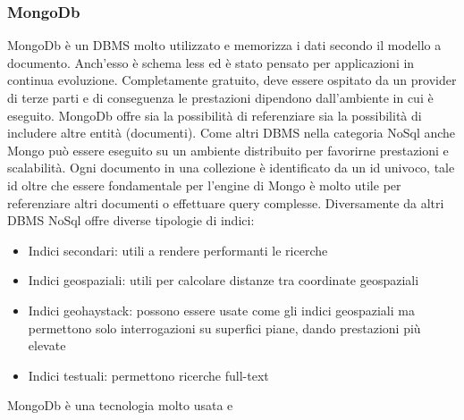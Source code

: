 \subsubsection*{MongoDb}
MongoDb è un DBMS molto utilizzato e memorizza i dati secondo il modello a documento. Anch'esso è schema less ed è stato pensato per applicazioni in continua evoluzione. Completamente gratuito, deve essere ospitato da un provider di terze parti e di conseguenza le prestazioni dipendono dall'ambiente in cui è eseguito. 
MongoDb offre sia la possibilità di referenziare sia la possibilità di includere altre entità (documenti). 
Come altri DBMS nella categoria NoSql anche Mongo può essere eseguito su un ambiente distribuito per favorirne prestazioni e scalabilità. Ogni documento in una collezione è identificato da un id univoco, tale id oltre che essere fondamentale per l'engine di Mongo è molto utile per referenziare altri documenti o effettuare query complesse.
Diversamente da altri DBMS NoSql offre diverse tipologie di indici:
\begin{itemize}
	\item Indici secondari: utili a rendere performanti le ricerche
	\item Indici geospaziali: utili per calcolare distanze tra coordinate geospaziali
	\item Indici geohaystack: possono essere usate come gli indici geospaziali ma permettono solo interrogazioni su superfici piane, dando prestazioni più elevate
	\item Indici testuali: permettono ricerche full-text
\end{itemize} 
MongoDb è una tecnologia molto usata e 


